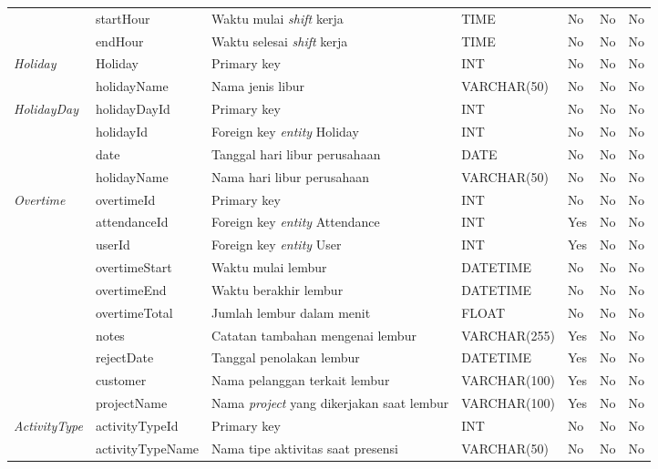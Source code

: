 \begin{longtable}{ |p{3cm}|p{3cm}|p{4cm}|p{3cm}|p{2cm}|p{2cm}|p{2cm}|}
\multirow{2}{*}{}
&startHour
&Waktu mulai \textit{shift} kerja
&TIME
&No
&No
&No
\\
\cline{2-7}
&endHour
&Waktu selesai \textit{shift} kerja
&TIME
&No
&No
&No
\\ 
\hline

\multirow{2}{*}{\textit{Holiday}}
&Holiday
&Primary key
&INT
&No
&No
&No
\\
\cline{2-7}
&holidayName
&Nama jenis libur
&VARCHAR(50)
&No
&No
&No
\\ 
\hline

\multirow{4}{*}{\textit{HolidayDay}}
&holidayDayId
&Primary key
&INT
&No
&No
&No
\\
\cline{2-7}
&holidayId
&Foreign key \textit{entity} Holiday
&INT
&No
&No
&No
\\
\cline{2-7}
&date
&Tanggal hari libur perusahaan
&DATE
&No
&No
&No
\\
\cline{2-7}
&holidayName
&Nama hari libur perusahaan
&VARCHAR(50)
&No
&No
&No
\\ 
\hline

\multirow{3}{*}{\textit{Overtime}}
&overtimeId
&Primary key
&INT
&No
&No
&No
\\
\cline{2-7}
&attendanceId
&Foreign key \textit{entity} Attendance
&INT
&Yes
&No
&No
\\ 
\cline{2-7}
&userId
&Foreign key \textit{entity} User
&INT
&Yes
&No
&No
\\ 
\hline

\multirow{7}{*}{}
&overtimeStart 
&Waktu mulai lembur
&DATETIME
&No
&No
&No
\\ 
\cline{2-7}
&overtimeEnd 
&Waktu berakhir lembur
&DATETIME
&No
&No
&No
\\ 
\cline{2-7}
&overtimeTotal
&Jumlah lembur dalam menit
&FLOAT
&No
&No
&No
\\ 
\cline{2-7}
&notes
&Catatan tambahan mengenai lembur
&VARCHAR(255)
&Yes
&No
&No
\\ 
\cline{2-7}
&rejectDate 
&Tanggal penolakan lembur
&DATETIME
&Yes
&No
&No
\\ 

\cline{2-7}
&customer 
&Nama pelanggan terkait lembur
&VARCHAR(100)
&Yes
&No
&No
\\ 
\cline{2-7}
&projectName 
&Nama \textit{project} yang dikerjakan saat lembur
&VARCHAR(100)
&Yes
&No
&No
\\ 
\hline

\multirow{2}{*}{\textit{ActivityType}}
&activityTypeId
&Primary key
&INT
&No
&No
&No
\\
\cline{2-7}
&activityTypeName
&Nama tipe aktivitas saat presensi 
&VARCHAR(50)
&No
&No
&No
\\ 
\hline


\end{longtable}
